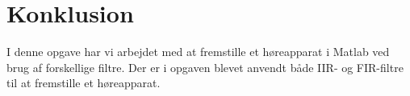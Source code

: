 \chapter{Konklusion}\label{ch:konclusion}
I denne opgave har vi arbejdet med at fremstille et høreapparat i Matlab ved brug af forskellige filtre. Der er i opgaven blevet anvendt både IIR- og FIR-filtre til at fremstille et høreapparat.
